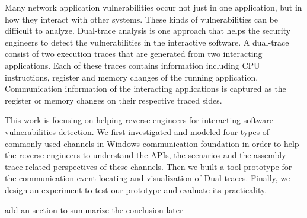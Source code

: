 \label{chapter:introduction}

Many network application vulnerabilities occur not just in one application, but in how they interact with other systems. These kinds of vulnerabilities can be difficult to analyze. Dual-trace analysis is one approach that helps the security engineers to detect the vulnerabilities in the interactive software. A dual-trace consist of two execution traces that are generated from two interacting applications. Each of these traces contains information including CPU instructions, register and memory changes of the running application. Communication information of the interacting applications is captured as the register or memory changes on their respective traced sides. 

This work is focusing on helping reverse engineers for interacting software vulnerabilities detection. We first investigated and modeled four types of commonly used channels in Windows communication foundation in order to help the reverse engineers to understand the APIs, the scenarios and the assembly trace related perspectives of these channels. Then we built a tool prototype for the communication event locating and visualization of Dual-traces. Finally, we design an experiment to test our prototype and evaluate its practicality. 

{add an section to summarize the conclusion later}
